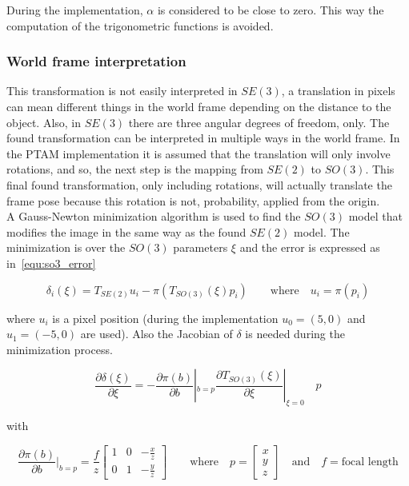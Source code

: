 During the implementation, $\alpha$ is considered to be close to zero. This way the computation of the trigonometric functions is avoided.\\






\subsubsection{World frame interpretation}
\label{ssub:world_frame_interpretation}

This transformation is not easily interpreted in $SE(3)$, a translation in pixels can mean different things in the world frame depending on the distance to the object. Also, in $SE(3)$ there are three angular degrees of freedom, only. The found transformation can be interpreted in multiple ways in the world frame. In the PTAM implementation it is assumed that the translation will only involve rotations, and so, the next step is the mapping from $SE(2)$ to $SO(3)$. This final found transformation, only including rotations, will actually translate the frame pose because this rotation is not, probability, applied from the origin.\\

A Gauss-Newton minimization algorithm is used to find the $SO(3)$ model that modifies the image in the same way as the found $SE(2)$ model. The minimization is over the $SO(3)$ parameters $\xi$ and the error is expressed as in~\ref{equ:so3_error}

\begin{equation}
  \delta_i(\xi) = T_{SE(2)}u_i - \pi(T_{SO(3)}(\xi) p_i) \qquad \text{where} \quad u_i = \pi(p_i)
  \label{equ:so3_error}
\end{equation}


where $u_i$ is a pixel position (during the implementation $u_0=(5,0)$ and $u_1=(-5,0)$ are used). Also the Jacobian of $\delta$ is needed during the minimization process.

\begin{equation}
  \frac{\partial \delta(\xi)}{\partial \xi} = -\frac{\partial \pi (b)}{\partial b}|_{b=p} \frac{\partial T_{SO(3)}(\xi)}{\partial\xi}|_{\xi=0} \quad p
\end{equation}

with

\begin{equation}
  \frac{\partial \pi(b)}{\partial b} |_{b=p} = \frac{f}{z}
  \begin{bmatrix}
    1 & 0 & -\frac{x}{z} \\
    0 & 1 & -\frac{y}{z}
  \end{bmatrix}
  \qquad \text{where} \quad 
  p = \begin{bmatrix} x \\ y \\ z \end{bmatrix} \quad \text{and} \quad f = \text{focal length}
\end{equation}

